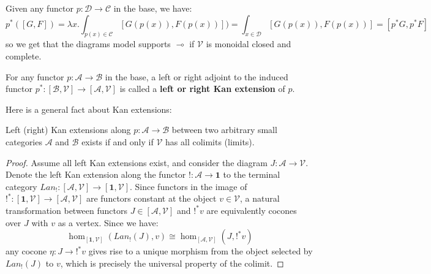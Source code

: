 \documentclass[a4paper,english]{lipics-v2018}
\begin{document}
Given any functor $p : \mathcal{D} \to \mathcal{C}$ in the base, we have:
\[
  p^*([G, F]) = \lambda x . \int_{p(x) \in \mathcal{C}}[G(p(x)), F(p(x))]) = \int_{x \in \mathcal{D}}[G(p(x)), F(p(x))] = [p^*G, p^*F]
\]
so we get that the diagrams model supports $\multimap$ if $\mathcal{V}$ is monoidal closed and complete.
\begin{definition}
  For any functor $p : \mathcal{A} \to \mathcal{B}$ in the base, a left or right adjoint to the induced functor $p^* : [\mathcal{B}, \mathcal{V}] \to [\mathcal{A}, \mathcal{V}]$ is called a \textbf{left or right Kan extension} of $p$.
\end{definition}
Here is a general fact about Kan extensions:
  \begin{theorem}\label{kanlimits}
    Left (right) Kan extensions along $p : \mathcal{A} \to \mathcal{B}$ between two arbitrary small categories $\mathcal{A}$ and $\mathcal{B}$ exists if and only if $\mathcal{V}$ has all colimits (limits).
    \begin{proof}Assume all left Kan extensions exist, and consider the diagram $J : \mathcal{A} \to \mathcal{V}$. Denote the left Kan extension along the functor $! : \mathcal{A} \to \mathbf{1}$ to the terminal category $Lan_! : [\mathcal{A}, \mathcal{V}] \to [\mathbf{1}, \mathcal{V}]$. Since functors in the image of $!^* : [\mathbf{1}, \mathcal{V}] \to [\mathcal{A}, \mathcal{V}]$ are functors constant at the object $v \in \mathcal{V}$, a natural transformation between functors $J \in [\mathcal{A}, \mathcal{V}]$ and $!^*v$ are equivalently cocones over $J$ with $v$ as a vertex. Since we have:
      \[
        \hom_{[\mathbf{1},\mathcal{V}]}(Lan_!(J), v) \cong \hom_{[\mathcal{A},\mathcal{V}]}(J, !^*v)
      \]
      any cocone $\eta : J \to !^*v$ gives rise to a unique morphism from the object selected by $Lan_!(J)$ to $v$, which is precisely the universal property of the colimit.


\end{proof}
\end{theorem}
\end{document}

